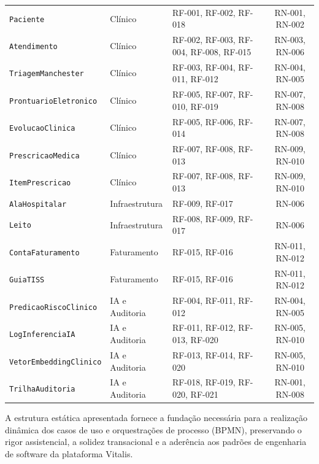 \begin{xltabular}{\textwidth}{l l X c}
\texttt{Paciente} & Clínico & RF-001, RF-002, RF-018 & RN-001, RN-002 \\
\texttt{Atendimento} & Clínico & RF-002, RF-003, RF-004, RF-008, RF-015 & RN-003, RN-006 \\
\texttt{TriagemManchester} & Clínico & RF-003, RF-004, RF-011, RF-012 & RN-004, RN-005 \\
\texttt{ProntuarioEletronico} & Clínico & RF-005, RF-007, RF-010, RF-019 & RN-007, RN-008 \\
\texttt{EvolucaoClinica} & Clínico & RF-005, RF-006, RF-014 & RN-007, RN-008 \\
\texttt{PrescricaoMedica} & Clínico & RF-007, RF-008, RF-013 & RN-009, RN-010 \\
\texttt{ItemPrescricao} & Clínico & RF-007, RF-008, RF-013 & RN-009, RN-010 \\
\midrule
\texttt{AlaHospitalar} & Infraestrutura & RF-009, RF-017 & RN-006 \\
\texttt{Leito} & Infraestrutura & RF-008, RF-009, RF-017 & RN-006 \\
\texttt{ContaFaturamento} & Faturamento & RF-015, RF-016 & RN-011, RN-012 \\
\texttt{GuiaTISS} & Faturamento & RF-015, RF-016 & RN-011, RN-012 \\
\midrule
\texttt{PredicaoRiscoClinico} & IA e Auditoria & RF-004, RF-011, RF-012 & RN-004, RN-005 \\
\texttt{LogInferenciaIA} & IA e Auditoria & RF-011, RF-012, RF-013, RF-020 & RN-005, RN-010 \\
\texttt{VetorEmbeddingClinico} & IA e Auditoria & RF-013, RF-014, RF-020 & RN-005, RN-010 \\
\texttt{TrilhaAuditoria} & IA e Auditoria & RF-018, RF-019, RF-020, RF-021 & RN-001, RN-008 \\
\end{xltabular}
\endgroup

A estrutura estática apresentada fornece a fundação necessária para a realização dinâmica dos casos de uso e orquestrações de processo (BPMN), preservando o rigor assistencial, a solidez transacional e a aderência aos padrões de engenharia de software da plataforma Vitalis.
